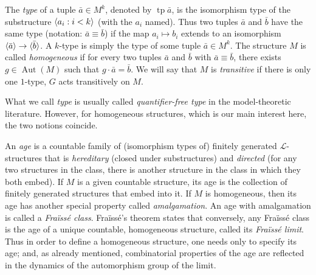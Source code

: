 \documentclass[JEP,XML,SOM,Unicode,published]{cedram}
\let\mathcal\mathscr
\theoremstyle{plain}
\theoremstyle{definition}
\newcommand{\cL}{\mathcal{L}}
\DeclareMathOperator{\Aut}{Aut}
\DeclareMathOperator{\tp}{tp}
\DeclarePairedDelimiter\gen{\langle}{\rangle}
\begin{document}
The \emph{type} of a tuple $\bar a \in M^k$, denoted by $\tp \bar a$, is the isomorphism type of the substructure $\gen{a_i : i < k}$ (with the $a_i$ named). Thus two tuples $\bar a$ and $\bar b$ have the same type (notation: $\bar a \equiv \bar b$) if the map $a_i \mapsto b_i$ extends to an isomorphism $\gen{\bar a} \to\nobreak \gen{\bar b}$. A $k$\nobreakdash-type is simply the type of some tuple $\bar a \in M^k$. The structure $M$ is called \emph{homogeneous} if for every two tuples $\bar a$ and $\bar b$ with $\bar a \equiv \bar b$, there exists $g \in \Aut(M)$ such that $g \cdot \bar a = \bar b$. We will say that $M$ is \emph{transitive} if there is only one $1$-type, \ie $G$ acts transitively on $M$.

What we call \emph{type} is usually called \emph{quantifier-free type} in the model-theoretic literature. However, for homogeneous structures, which is our main interest here, the two notions coincide.\enlargethispage{.5\baselineskip}%

An \emph{age} is a countable family of (isomorphism types of) finitely generated $\cL$\nobreakdash-structures that is \emph{hereditary} (\ie closed under substructures) and \emph{directed} (\ie for any two structures in the class, there is another structure in the class in which they both embed). If $M$ is a given countable structure, its age is the collection of finitely generated structures that embed into it. If $M$ is homogeneous, then its age has another special property called \emph{amalgamation}. An age with amalgamation is called a \emph{Fraïssé class}. Fraïssé's theorem states that conversely, any Fraïssé class is the age of a unique countable, homogeneous structure, called its \emph{Fraïssé limit}. Thus in order to define a homogeneous structure, one needs only to specify its age; and, as already mentioned, combinatorial properties of the age are reflected in the dynamics of the automorphism group of the limit.
\end{document}
